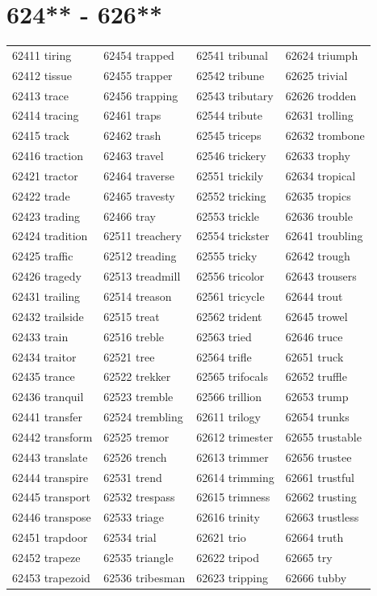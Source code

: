 \documentclass[10pt, oneside]{book}
\begin{document}
\begin{table}
	\centering
	\section*{624** - 626**}
	\begin{tabular}{l l l l}
62411 tiring &62454 trapped &62541 tribunal &62624 triumph\\
62412 tissue &62455 trapper &62542 tribune &62625 trivial\\
62413 trace &62456 trapping &62543 tributary &62626 trodden\\
62414 tracing &62461 traps &62544 tribute &62631 trolling\\
62415 track &62462 trash &62545 triceps &62632 trombone\\
62416 traction &62463 travel &62546 trickery &62633 trophy\\
62421 tractor &62464 traverse &62551 trickily &62634 tropical\\
62422 trade &62465 travesty &62552 tricking &62635 tropics\\
62423 trading &62466 tray &62553 trickle &62636 trouble\\
62424 tradition &62511 treachery &62554 trickster &62641 troubling\\
62425 traffic &62512 treading &62555 tricky &62642 trough\\
62426 tragedy &62513 treadmill &62556 tricolor &62643 trousers\\
62431 trailing &62514 treason &62561 tricycle &62644 trout\\
62432 trailside &62515 treat &62562 trident &62645 trowel\\
62433 train &62516 treble &62563 tried &62646 truce\\
62434 traitor &62521 tree &62564 trifle &62651 truck\\
62435 trance &62522 trekker &62565 trifocals &62652 truffle\\
62436 tranquil &62523 tremble &62566 trillion &62653 trump\\
62441 transfer &62524 trembling &62611 trilogy &62654 trunks\\
62442 transform &62525 tremor &62612 trimester &62655 trustable\\
62443 translate &62526 trench &62613 trimmer &62656 trustee\\
62444 transpire &62531 trend &62614 trimming &62661 trustful\\
62445 transport &62532 trespass &62615 trimness &62662 trusting\\
62446 transpose &62533 triage &62616 trinity &62663 trustless\\
62451 trapdoor &62534 trial &62621 trio &62664 truth\\
62452 trapeze &62535 triangle &62622 tripod &62665 try\\
62453 trapezoid &62536 tribesman &62623 tripping &62666 tubby\\
	\end{tabular}
 \end{table}
\clearpage
\end{document}

